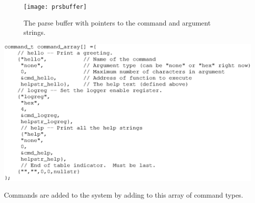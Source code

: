 \begin{figure}[ht]
    \begin{center}
        \texttt{[image: prsbuffer]}
        \caption{The parse buffer with pointers to the command and argument strings.\label{fig:prsbuffer}}
    \end{center}
\end{figure}

\begin{listing}[ht]
    \begin{center}
        \includegraphics[clip,scale=0.75]{command_array}
        \caption{Commands are added to the system by adding to this array of command types.\label{lst:cmdarray}}
    \end{center}
\end{listing}

\clearpage{}
